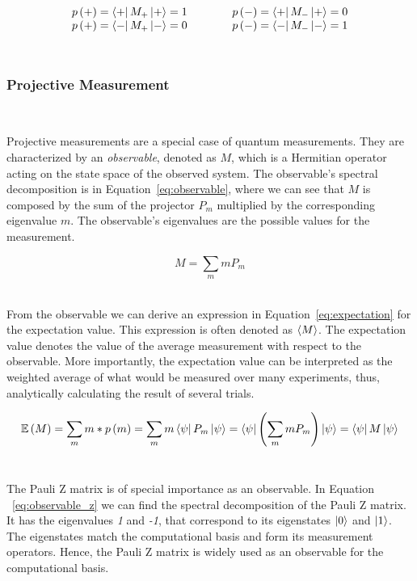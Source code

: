 \begin{equation}\label{eq:hadamard_states}
  \begin{matrix}
    p\left(+\right) = \bra{+}M_+\ket{+} = 1 \\
    p\left(+\right) = \bra{-}M_+\ket{-} = 0
  \end{matrix} \qquad \qquad
  \begin{matrix}
    p\left(-\right) = \bra{+}M_-\ket{+} = 0\\
    p\left(-\right) = \bra{-}M_-\ket{-} = 1
  \end{matrix}
\end{equation} \

\subsubsection{Projective Measurement} \

Projective measurements are a special case of quantum measurements.
They are characterized by an \textit{observable}, denoted as \(M\),
which is a Hermitian operator acting on the state space of the observed system.
The observable's spectral decomposition is in Equation~\ref{eq:observable},
where we can see that \(M\) is composed by the sum of the projector \(P_m\)
multiplied by the corresponding eigenvalue \(m\). The observable's
eigenvalues are the possible values for the measurement. \

\begin{equation}\label{eq:observable}
  M = \sum_{m}mP_m
\end{equation} \

From the observable we can derive an expression in Equation~\ref{eq:expectation}
for the expectation value. This expression is often denoted as \(\ev{M}\).
The expectation value denotes the value of the average measurement with
respect to the observable. More importantly, the expectation value can be
interpreted as the weighted average of what would be measured over many experiments,
thus, analytically calculating the result of several trials. \ 

\begin{equation}\label{eq:expectation}
  \mathbb{E}\left(M\right) =
  \sum_{m}m*p\left(m\right) =
  \sum_{m}m\bra{\psi}P_m\ket{\psi} =
  \bra{\psi} \left(\sum_{m}mP_m\right) \ket{\psi} =
  \bra{\psi}M\ket{\psi}
\end{equation} \

The Pauli Z matrix is of special importance as an observable. In Equation
~\ref{eq:observable_z} we can find the spectral decomposition of the
Pauli Z matrix. It has the eigenvalues \textit{1} and \textit{-1}, that
correspond to its eigenstates \(\ket{0}\) and \(\ket{1}\). The eigenstates
match the computational basis and form its measurement operators. Hence,
the Pauli Z matrix is widely used as an observable for the computational
basis. \


